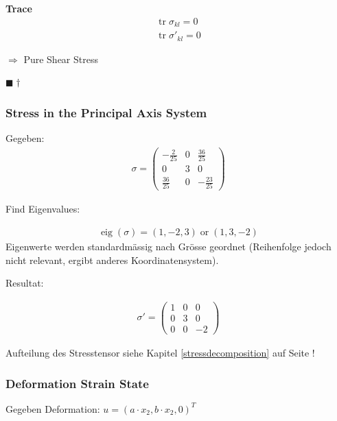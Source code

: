\documentclass[a4paper]{scrartcl}
\newcommand{\qed}{\begin{flushright}
$\blacksquare \dagger$ \end{flushright}}
\begin{document}
\textbf{Trace}\\

\begin{align}
\operatorname{tr}\sigma_{kl}=0 \\
\operatorname{tr}\sigma'_{kl}=0 
\end{align}

$\Rightarrow$ Pure Shear Stress
\qed
\subsubsection{Stress in the Principal Axis System}
Gegeben:
\begin{align}
\sigma=\begin{pmatrix}
-\frac{2}{25} & 0 & \frac{36}{25} \\
0 & 3 & 0 \\
\frac{36}{25}& 0 & -\frac{23}{25}
\end{pmatrix}
\end{align}

Find Eigenvalues:

\begin{align}
\operatorname{eig}(\sigma)=\left(1,-2, 3\right) \operatorname{or}
\left(1,3,-2\right)
\end{align}
Eigenwerte werden standardmässig nach Grösse geordnet (Reihenfolge jedoch nicht
relevant, ergibt anderes Koordinatensystem).


Resultat:

\begin{align}
\sigma'=\begin{pmatrix}
1 & 0 & 0 \\
0 & 3 & 0 \\
0 & 0 & -2
\end{pmatrix}
\end{align}

Aufteilung des Stresstensor siehe Kapitel \ref{stressdecomposition} auf Seite
\pageref{stressdecomposition}!

\subsubsection{Deformation Strain State}\label{9.3} %
Gegeben Deformation: $u = (a \cdot x_2, b \cdot x_2, 0)^T$
\end{document}
